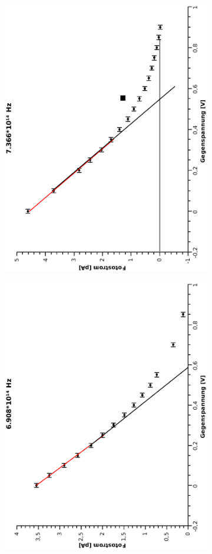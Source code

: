 \documentclass[12pt]{article}
\begin{document}
\begin{figure}
\begin{subfigure}{0.48\linewidth}
\end{subfigure}
\begin{subfigure}{0.48\textwidth}
\includegraphics[width=0.75\linewidth, angle=-90]{7366.eps}
\end{subfigure}
\begin{subfigure}{0.48\textwidth}
\includegraphics[width=0.75\linewidth, angle=-90]{6908.eps}

\end{subfigure}
\end{figure}
\end{document}
